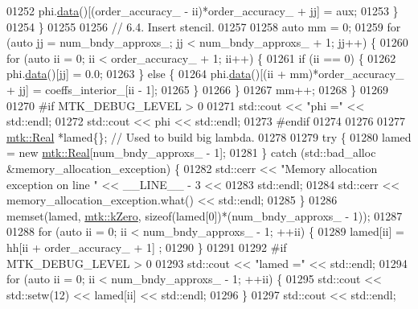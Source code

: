 \begin{DoxyCode}
{{01252         phi.\hyperlink{classmtk_1_1DenseMatrix_a0c33b8a9e01d157c61ddbdf807c25d84}{data}()[(order\_accuracy\_ - ii)*order\_accuracy\_ + jj] = aux;
01253       \}
01254     \}
01255 
01256     \textcolor{comment}{// 6.4. Insert stencil.}
01257 
01258     \textcolor{keyword}{auto} mm = 0;
01259     \textcolor{keywordflow}{for} (\textcolor{keyword}{auto} jj = num\_bndy\_approxs\_; jj < num\_bndy\_approxs\_ +  1; jj++) \{
01260       \textcolor{keywordflow}{for} (\textcolor{keyword}{auto} ii = 0; ii < order\_accuracy\_ + 1; ii++) \{
01261         \textcolor{keywordflow}{if} (ii == 0) \{
01262           phi.\hyperlink{classmtk_1_1DenseMatrix_a0c33b8a9e01d157c61ddbdf807c25d84}{data}()[jj] = 0.0;
01263         \} \textcolor{keywordflow}{else} \{
01264           phi.\hyperlink{classmtk_1_1DenseMatrix_a0c33b8a9e01d157c61ddbdf807c25d84}{data}()[(ii + mm)*order\_accuracy\_ + jj] = coeffs\_interior\_[ii - 1];
01265         \}
01266       \}
01267       mm++;
01268     \}
01269 
01270 \textcolor{preprocessor}{    #if MTK\_DEBUG\_LEVEL > 0}
01271     std::cout << \textcolor{stringliteral}{"phi ="} << std::endl;
01272     std::cout << phi << std::endl;
01273 \textcolor{preprocessor}{    #endif}
01274 
01276 
01277     \hyperlink{group__c01-roots_gac080bbbf5cbb5502c9f00405f894857d}{mtk::Real} *lamed\{\};  \textcolor{comment}{// Used to build big lambda.}
01278 
01279     \textcolor{keywordflow}{try} \{
01280       lamed = \textcolor{keyword}{new} \hyperlink{group__c01-roots_gac080bbbf5cbb5502c9f00405f894857d}{mtk::Real}[num\_bndy\_approxs\_ - 1];
01281     \} \textcolor{keywordflow}{catch} (std::bad\_alloc &memory\_allocation\_exception) \{
01282       std::cerr << \textcolor{stringliteral}{"Memory allocation exception on line "} << \_\_LINE\_\_ - 3 <<
01283         std::endl;
01284       std::cerr << memory\_allocation\_exception.what() << std::endl;
01285     \}
01286     memset(lamed, \hyperlink{group__c01-roots_ga59a451a5fae30d59649bcda274fea271}{mtk::kZero}, \textcolor{keyword}{sizeof}(lamed[0])*(num\_bndy\_approxs\_ - 1));
01287 
01288     \textcolor{keywordflow}{for} (\textcolor{keyword}{auto} ii = 0; ii < num\_bndy\_approxs\_ - 1; ++ii) \{
01289       lamed[ii] = hh[ii + order\_accuracy\_ + 1] ;
01290     \}
01291 
01292 \textcolor{preprocessor}{    #if MTK\_DEBUG\_LEVEL > 0}
01293     std::cout << \textcolor{stringliteral}{"lamed ="} << std::endl;
01294     \textcolor{keywordflow}{for} (\textcolor{keyword}{auto} ii = 0; ii < num\_bndy\_approxs\_ - 1; ++ii) \{
01295       std::cout << std::setw(12) << lamed[ii] << std::endl;
01296     \}
01297     std::cout << std::endl;
}}
\end{DoxyCode}
